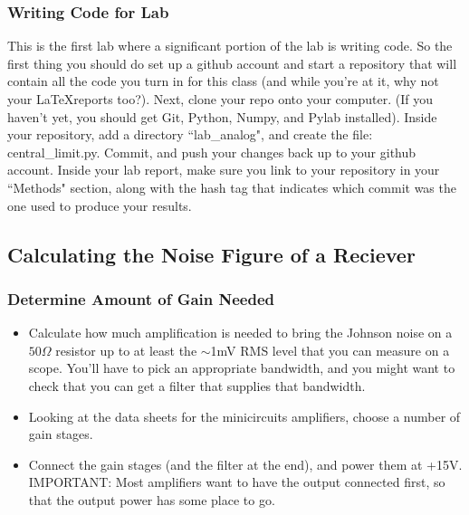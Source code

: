 \documentclass[11pt]{article}
\begin{document}
\subsubsection*{Writing Code for Lab}

This is the first lab where a significant portion of the lab is writing code. 
So the first thing you should do set up a github
account and start a repository that will contain all the code you turn in for this class (and
while you're at it, why not your \LaTeX reports too?).
Next, clone your repo onto your computer.  (If you haven't yet, you should get Git, Python, Numpy,
and Pylab installed).  Inside your repository, add a directory ``lab\_analog", and create
the file: central\_limit.py.  Commit, and push your changes back up to
your github account.  Inside your lab report, make sure you link to your repository in
your ``Methods" section, along with the hash tag that indicates which commit was the one used
to produce your results.  

\subsection{Calculating the Noise Figure of a Reciever}

\subsubsection*{Determine Amount of Gain Needed}
\begin{itemize}[noitemsep,nolistsep]
\item Calculate how much amplification is needed to bring the Johnson noise on a $50\Omega$ resistor
up to at least the $\sim$1mV RMS level that you can measure on a scope.  You'll have to pick an appropriate
bandwidth, and you might want to check that you can get a filter that supplies that bandwidth. 
\item Looking at the data sheets for the minicircuits amplifiers, choose a number of gain stages.
\item Connect the gain stages (and the filter at the end), and power them at +15V.  IMPORTANT: Most amplifiers
want to have the output connected first, so that the output power has some place to go.
\end{itemize}
\end{document}

